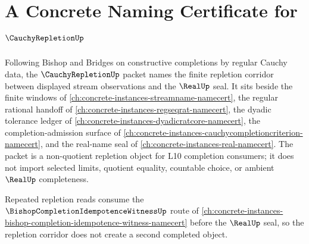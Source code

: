 \chapter{A Concrete Naming Certificate for $\CauchyRepletionUp$}
\label{ch:concrete-instances-cauchy-repletion-namecert}

Following Bishop and Bridges on constructive completions by regular Cauchy data, the $\CauchyRepletionUp$ packet names the finite repletion corridor between displayed stream observations and the $\RealUp$ seal. It sits beside the finite windows of \autoref{ch:concrete-instances-streamname-namecert}, the regular rational handoff of \autoref{ch:concrete-instances-regseqrat-namecert}, the dyadic tolerance ledger of \autoref{ch:concrete-instances-dyadicratcore-namecert}, the completion-admission surface of \autoref{ch:concrete-instances-cauchycompletioncriterion-namecert}, and the real-name seal of \autoref{ch:concrete-instances-real-namecert}. The packet is a non-quotient repletion object for L10 completion consumers; it does not import selected limits, quotient equality, countable choice, or ambient $\RealUp$ completeness.

Repeated repletion reads consume the $\BishopCompletionIdempotenceWitnessUp$ route of \autoref{ch:concrete-instances-bishop-completion-idempotence-witness-namecert} before the $\RealUp$ seal, so the repletion corridor does not create a second completed object.


